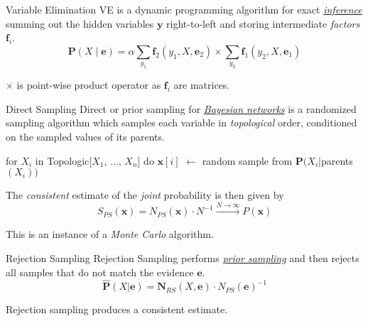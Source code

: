 \documentclass{cognito}
\begin{document}
\begin{note}{Variable Elimination}
	VE is a dynamic programming algorithm for exact \hyperref[note:Probabilistic Inference]{\it inference}
	summing out the hidden variables $\mathbf{y}$ right-to-left
	and storing intermediate \emph{factors} $\mathbf{f}_i$. 
	$$
	 \textstyle \mathbf{P}(X\mid \mathbf{e}) = \alpha \sum_{y_1} \mathbf{f}_2(y_1, X, \mathbf{e}_2) \times \sum_{y_2} \mathbf{f}_1(y_2, X, \mathbf{e}_1)
	$$
	\begin{remark} $\times$ is point-wise product operator as $\mathbf{f}_i$ are matrices.\end{remark}
	\vspace{-5pt}
\end{note}

\begin{note}{Direct Sampling}
	Direct or prior sampling for \hyperref[note:Bayesian Networks]{\it Bayesian networks} is a randomized sampling algorithm which samples
	each variable in \emph{topological} order, conditioned on the sampled values of its parents.
	\begin{code}
for $X_i$ in Topologic[$X_1$, ..., $X_n$] do
	$\mathbf{x}[i]$ $\leftarrow$ random sample from $\mathbf{P}(X_i | $parents$(X_i) )$
	\end{code}
	The \emph{consistent} estimate of the \emph{joint} probability is then given by
	$$
		\textstyle S_{PS}(\mathbf{x}) = N_{PS}(\mathbf{x}) \cdot N^{-1} \xrightarrow{N \to \infty } P(\mathbf{x})
	$$
	\begin{remark} This is an instance of a \emph{Monte Carlo} algorithm.\end{remark}
	\vspace{-5pt}
\end{note}

\begin{note}{Rejection Sampling}
	Rejection Sampling performs \hyperref[note:Direct Sampling]{\emph{prior sampling}}
	and then rejects all samples that do not match the evidence $\mathbf{e}$.
	$$
		\textstyle \mathbf{\hat{P}}(X | \mathbf{e}) = \mathbf{N}_{RS}(X, \mathbf{e}) \cdot N_{PS}(\mathbf{e})^{-1}
	$$
	\begin{remark} Rejection sampling produces a consistent estimate.\end{remark}
	\vspace{-5pt}
\end{note}
\end{document}
